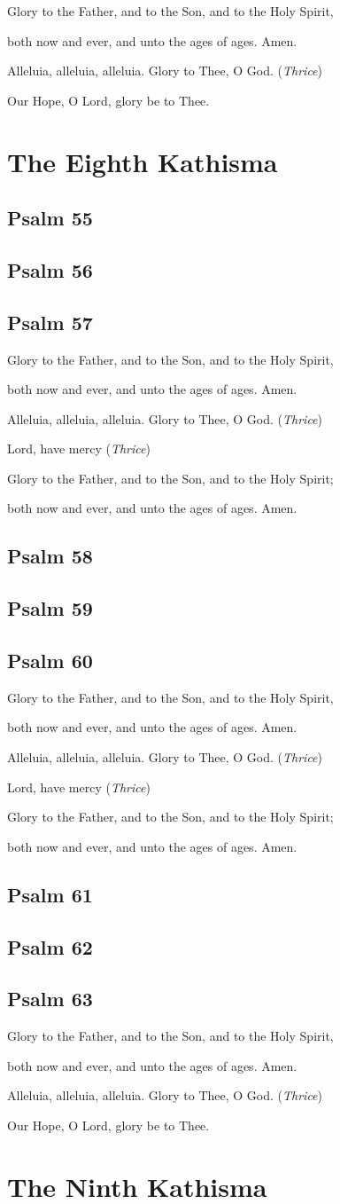 \documentclass[12pt,openany]{book}
\newcommand{\kathismabreak}{
  \medskip
  \begin{center}
  \begin{footnotesize}
  Glory to the Father, and to the Son, and to the Holy Spirit,
  
  both now and ever, and unto the ages of ages. Amen.

  Alleluia, alleluia, alleluia. Glory to Thee, O God. (\textit{Thrice})

  Lord, have mercy (\textit{Thrice})

  Glory to the Father, and to the Son, and to the Holy Spirit;
  
  both now and ever, and unto the ages of ages. Amen.
  \end{footnotesize}
  \end{center}
  \smallbreak
}
\newcommand{\kathismaend}{
  \medskip
  \begin{center}
  \begin{footnotesize}
  Glory to the Father, and to the Son, and to the Holy Spirit,
  
  both now and ever, and unto the ages of ages. Amen.

  Alleluia, alleluia, alleluia. Glory to Thee, O God. (\textit{Thrice})

  Our Hope, O Lord, glory be to Thee.
  \end{footnotesize}
  \end{center}
  \smallbreak
}
\begin{document}
\kathismaend

\chapter*{The Eighth Kathisma}
\smallskip
\section{Psalm 55}

\smallskip
\section{Psalm 56}

\smallskip
\section{Psalm 57}


\kathismabreak
\smallskip
\section{Psalm 58}

\smallskip
\section{Psalm 59}

\smallskip
\section{Psalm 60}


\kathismabreak
\smallskip
\pagebreak %
\section{Psalm 61}

\smallskip
\section{Psalm 62}

\smallskip
\section{Psalm 63}


\kathismaend

\chapter*{The Ninth Kathisma}
\smallskip
\end{document}
